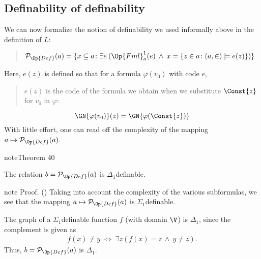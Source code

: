 \documentclass[letterpaper,10pt,english]{jupyterBook}
\begin{document}
\subsection{Definability of definability}
\label{\detokenize{constructible:definability-of-definability}}
\sphinxAtStartPar
We can now formalize the notion of definability we used informally above in the definition of \(L\):
\begin{quote}

\sphinxAtStartPar
\(\mathcal{P}_{\Op{Def}}(a) = \{ x \subseteq a \colon \exists e \: (\Op{Fml}^1_a(e) \: \wedge \: x = \{z \in a\colon (a,\in) \models e(z)\})\}\)
\end{quote}

\sphinxAtStartPar
Here, \(e(z)\) is defined so that for a formula \(\varphi(v_0)\) with code \(e\),
\begin{quote}

\sphinxAtStartPar
\(e(z)\) is the code of the formula we obtain when we substitute \(\Const{z}\) for \(v_0\) in \(\varphi\):
\end{quote}
\begin{equation*}
	\GN{\varphi(v_0)}(z) = \GN{\varphi(\Const{z})}
\end{equation*}
\sphinxAtStartPar
With little effort, one can read off the complexity of the mapping \(a \mapsto \mathcal{P}_{\Op{Def}}(a)\).
\label{constructible:thm-definability-Pdef}
\begin{sphinxadmonition}{note}{Theorem 40}



\sphinxAtStartPar
The relation \(b = \mathcal{P}_{\Op{Def}}(a)\) is \(\Delta_1\)\sphinxhyphen{}definable.
\end{sphinxadmonition}

\begin{sphinxadmonition}{note}
\sphinxAtStartPar
Proof. () Taking into account the complexity of the various sub\sphinxhyphen{}formulas, we see that the mapping \(a \mapsto \mathcal{P}_{\Op{Def}}(a)\) is \(\Sigma_1\)\sphinxhyphen{}definable.

\sphinxAtStartPar
The graph of a \(\Sigma_1\)\sphinxhyphen{}definable function \(f\) (with domain \(\V\)) is \(\Delta_1\), since the complement is given as
\begin{equation*}
\begin{split}
	f(x) \neq y \; \Leftrightarrow \; \exists z (f(x)=z \: \wedge \: y \neq z).
\end{split}
\end{equation*}
\sphinxAtStartPar
Thus,  \(b = \mathcal{P}_{\Op{Def}}(a)\) is \(\Delta_1\).
\end{sphinxadmonition}
\end{document}
